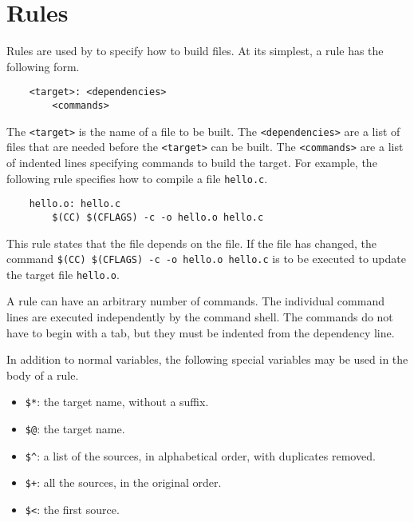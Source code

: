 %
%
%
\chapter{Rules}
\label{chapter:rules}

Rules are used by \OMake{} to specify how to build files.  At its simplest, a rule has the following
form.

\begin{verbatim}
    <target>: <dependencies>
        <commands>
\end{verbatim}

The \verb+<target>+ is the name of a file to be built.  The \verb+<dependencies>+ are a list of
files that are needed before the \verb+<target>+ can be built.  The \verb+<commands>+ are a list of
indented lines specifying commands to build the target.  For example, the following rule specifies
how to compile a file \verb+hello.c+.

\begin{verbatim}
    hello.o: hello.c
        $(CC) $(CFLAGS) -c -o hello.o hello.c
\end{verbatim}

This rule states that the  file depends on the  file.  If the
 file has changed, the command \verb+$(CC) $(CFLAGS) -c -o hello.o hello.c+ is to
be executed to update the target file \verb+hello.o+.

A rule can have an arbitrary number of commands.  The individual command lines are executed
independently by the command shell.  The commands do not have to begin with a tab, but they must be
indented from the dependency line.

In addition to normal variables, the following special variables may be used in the body of a rule.

\begin{itemize}
\item \verb+$*+: the target name, without a suffix.
\item \verb+$@+: the target name.
\item \verb+$^+: a list of the sources, in alphabetical order, with
duplicates removed.
\item \verb.$+.: all the sources, in the original order.
\item \verb+$<+: the first source.
\end{itemize}

